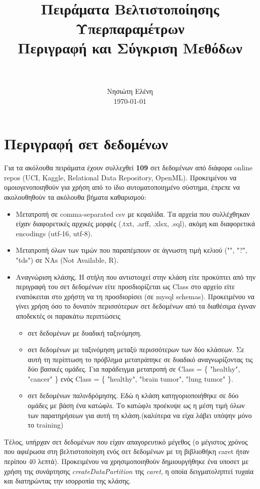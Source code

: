\documentclass[]{article}
\title{
	\usefont{OT1}{bch}{b}{n}
	\normalfont \normalsize \textsc{} \\ 
	\horrule{0.5pt} \\[0.4cm]
	\huge Πειράματα  Βελτιστοποίησης Υπερπαραμέτρων\\ Περιγραφή και Σύγκριση Μεθόδων \\
	\horrule{2pt} \\[0.5cm]
}
\author{
	\normalfont 								\normalsize
	Νησιώτη Ελένη\\[-3pt]		\normalsize
	\today
}
\date{}
\numberwithin{equation}{section}		%
\numberwithin{figure}{section}			%
\numberwithin{table}{section}				%
\begin{document}
	\maketitle
	\section{Περιγραφή σετ δεδομένων}
	Για τα ακόλουθα πειράματα έχουν συλλεχθεί \textbf{109} σετ δεδομένων από διάφορα online repos (UCI, Kaggle, Relational Data Repository, OpenML). Προκειμένου να ομοιογενοποιηθούν για χρήση από το ίδιο αυτοματοποιημένο σύστημα, έπρεπε να ακολουθηθούν τα ακόλουθα βήματα καθαρισμού:
	 \begin{itemize}
	 	\item Μετατροπή σε comma-separated csv με κεφαλίδα. Τα αρχεία που συλλέχθηκαν είχαν διαφορετικές αρχικές μορφές (.txt, .arff, .xlsx, .sql), ακόμη και διαφορετικά encodings (utf-16, utf-8). 
	 	\item Μετατροπή όλων των τιμών που παραπέμπουν σε άγνωστη τιμή κελιού ("", "?", "tds") σε NAs (Not Available, R).
	 	\item Αναγνώριση κλάσης. Η στήλη που αντιστοιχεί στην κλάση είτε προκύπτει από την περιγραφή του σετ δεδομένων είτε προσδιορίζεται ως Class στο αρχείο είτε εναπόκειται στο χρήστη να τη προσδιορίσει (σε mysql schemas). Προκειμένου να γίνει χρήση όσο το δυνατόν περισσότερων σετ δεδομένων από τα διαθέσιμα έγιναν αποδεκτές οι παρακάτω περιπτώσεις
	 	\begin{itemize}
	 		\item σετ δεδομένων με δυαδική ταξινόμηση. 
	 		\item σετ δεδομένων με ταξινόμηση μεταξύ περισσότερων των δύο κλάσεων. Σε αυτή τη περίπτωση το πρόβλημα μετατράπηκε σε δυαδικό αναγνωρίζοντας τις δύο βασικές ομάδες. Για παράδειγμα μετατροπή σε Class = \{ "healthy", "cancer" \} ενός Class = \{ "healthy", "brain tumor", "lung tumor" \}.
	 		\item σετ δεδομένων παλινδρόμησης. Εδώ η κλάση κατηγοριοποιήθηκε σε δύο ομάδες με βάση ένα κατώφλι. Το κατώφλι προέκυψε ως η μέση τιμή όλων των παρατηρήσεων για αυτή τη κλάση.(καλύτερα να είχα λάβει υπόψην μόνο το training)
	 	\end{itemize}
	 \end{itemize}
	 
	 Τέλος, υπήρχαν σετ δεδομένων που είχαν απαγορευτικό μέγεθος (ο μέγιστος χρόνος που αφιέρωσα στη βελτιστοποίηση ενός σετ δεδομένων με τη βιβλιοθήκη caret ήταν περίπου 40 λεπτά). Προκειμένου να χρησιμοποιηθούν δημιουργήθηκε ένα υποσετ με χρήση της συνάρτησης \textit{createDataPartition} της \textit{caret}, η οποία δειγματοληπτεί τυχαία και διατηρώντας την ισορροπία της κλάσης. 
	 
\end{document}
